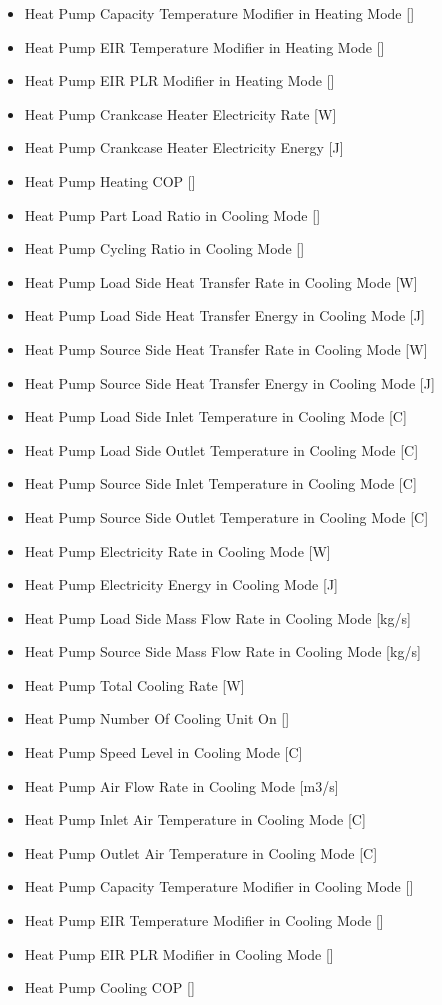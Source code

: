 \begin{itemize}
\item Heat Pump Capacity Temperature Modifier in Heating Mode {[}{]}
\item Heat Pump EIR Temperature Modifier in Heating Mode {[}{]}
\item Heat Pump EIR PLR Modifier in Heating Mode {[}{]}
\item Heat Pump Crankcase Heater Electricity Rate {[}W{]}
\item Heat Pump Crankcase Heater Electricity Energy {[}J{]}
\item Heat Pump Heating COP {[}{]}
\item Heat Pump Part Load Ratio in Cooling Mode {[}{]}
\item Heat Pump Cycling Ratio in Cooling Mode {[}{]}
\item Heat Pump Load Side Heat Transfer Rate in Cooling Mode {[}W{]}
\item Heat Pump Load Side Heat Transfer Energy in Cooling Mode {[}J{]}
\item Heat Pump Source Side Heat Transfer Rate in Cooling Mode {[}W{]}
\item Heat Pump Source Side Heat Transfer Energy in Cooling Mode {[}J{]}
\item Heat Pump Load Side Inlet Temperature in Cooling Mode {[}C{]}
\item Heat Pump Load Side Outlet Temperature in Cooling Mode {[}C{]}
\item Heat Pump Source Side Inlet Temperature in Cooling Mode {[}C{]}
\item Heat Pump Source Side Outlet Temperature in Cooling Mode {[}C{]}
\item Heat Pump Electricity Rate in Cooling Mode {[}W{]}
\item Heat Pump Electricity Energy in Cooling Mode {[}J{]}
\item Heat Pump Load Side Mass Flow Rate in Cooling Mode {[}kg/s{]}
\item Heat Pump Source Side Mass Flow Rate in Cooling Mode {[}kg/s{]}
\item Heat Pump Total Cooling Rate {[}W{]}
\item Heat Pump Number Of Cooling Unit On {[}{]}
\item Heat Pump Speed Level in Cooling Mode {[}C{]}
\item Heat Pump Air Flow Rate in Cooling Mode {[}m3/s{]}
\item Heat Pump Inlet Air Temperature in Cooling Mode {[}C{]}
\item Heat Pump Outlet Air Temperature in Cooling Mode {[}C{]}
\item Heat Pump Capacity Temperature Modifier in Cooling Mode {[}{]}
\item Heat Pump EIR Temperature Modifier in Cooling Mode {[}{]}
\item Heat Pump EIR PLR Modifier in Cooling Mode {[}{]}
\item Heat Pump Cooling COP {[}{]}
\end{itemize}
